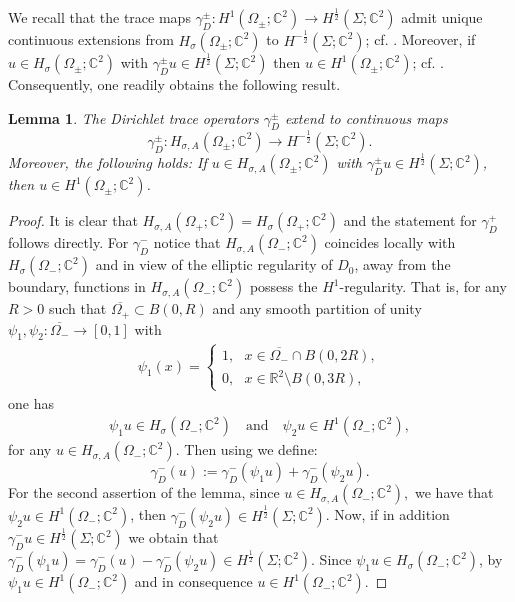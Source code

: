 \documentclass[11pt,a4paper,reqno,oneside]{amsproc}
\def \rr {{\mathbb R}}
\def \cc {{\mathbb C}}
\numberwithin{equation}{section}
\def \cc {{\mathbb{C}}}
\newtheorem{lemma}[definition]{Lemma}
\begin{document}
We recall that the trace maps $\gamma_D^\pm: H^1(\Omega_\pm; \mathbb{C}^2) \rightarrow H^{\frac{1}{2}}(\Sigma; \mathbb{C}^2)$ admit unique continuous extensions from $H_\sigma(\Omega_\pm; \mathbb{C}^2)$ to $H^{-\frac{1}{2}}(\Sigma; \mathbb{C}^2)$; cf. \cite[Lemma 2.3]{BFSV}. Moreover, if $u\in H_{\sigma}(\Omega_\pm;\cc^2) $ with $\gamma^\pm_D u\in H^{\frac{1}{2}}(\Sigma;\cc^2)$ then $u\in H^1(\Omega_\pm;\cc^2)$; cf. \cite[Lemma 2.4]{BFSV}.  Consequently, one readily obtains the following result.
\begin{lemma}\label{tracemap} The Dirichlet trace operators $\gamma_D^\pm$ extend to continuous maps 
\[
\gamma_D^\pm:H_{\sigma, A}(\Omega_\pm; \mathbb{C}^2)\rightarrow H^{-\frac{1}{2}}(\Sigma; \mathbb{C}^2). 
\] 
Moreover, the following holds:
 If $u\in H_{\sigma, A}(\Omega_\pm;\cc^2) $ with $\gamma^\pm_D u\in H^{\frac{1}{2}}(\Sigma;\cc^2)$, then $u\in H^1(\Omega_\pm;\cc^2)$.
\end{lemma} 
\begin{proof}
    It is clear that $H_{\sigma, A}(\Omega_+;\cc^2)=H_{\sigma}(\Omega_+;\cc^2)$ and  the statement for $\gamma_D^+$ follows directly.   For $\gamma_D^-$ notice that  $H_{\sigma, A}(\Omega_-;\cc^2)$ coincides locally with $H_{\sigma}(\Omega_-;\cc^2)$ and in view of the elliptic regularity of $D_0$, away from the boundary, functions in $H_{\sigma, A}(\Omega_-;\cc^2)$ possess the $H^1$-regularity.  That is,   for any $R>0$ such that $\overline{\Omega_+}\subset B(0,R)$ and any smooth partition of unity $\psi_1,\psi_2:\overline{\Omega_-} \longrightarrow [0,1]$ with 
     \begin{align*}
    \psi_1(x)= \begin{cases}
    1, \,\,\,\,  x\in \overline{\Omega_-}\cap B(0,2R),\\
    0, \,\, \,\,  x\in \rr^2 \setminus B(0,3R),
\end{cases}
\end{align*}
 one has
    \begin{align*}
     \psi_1 u\in H_{\sigma}(\Omega_-;\cc^2) \quad\text{and}\quad \psi_2u\in H^1(\Omega_-;\cc^2),
     \end{align*}
     for any $u\in H_{\sigma, A}(\Omega_-;\cc^2)$.  Then using \cite[Lemma 2.3]{BFSV} we define:
\[
\gamma_D^-(u):=\gamma_D^-(\psi_1 u)+\gamma_D^-(\psi_2 u).
\]     
For the second assertion  of the lemma, since    $u\in H_{\sigma, A}(\Omega_-;\cc^2), $  we have that   $\psi_2u\in H^1(\Omega_-;\cc^2) $, then $\gamma_D^-(\psi_2 u)\in H^{\frac{1}{2}}(\Sigma;\cc^2)$.  Now, if in addition   $\gamma^-_D u\in H^{\frac{1}{2}}(\Sigma;\cc^2)$ we obtain that 
$\gamma_D^-(\psi_1 u)=\gamma_D^-(u)-\gamma_D^-(\psi_2 u)\in H^{\frac{1}{2}}(\Sigma;\cc^2)$. Since   $\psi_1 u\in H_{\sigma}(\Omega_-;\cc^2)$, by \cite[Lemma 2.4]{BFSV} $\psi_1 u \in H^1(\Omega_-;\cc^2) $ and in consequence  $ u \in H^1(\Omega_-;\cc^2)$.
\end{proof}
\end{document}
